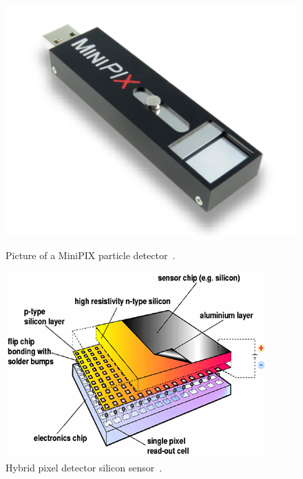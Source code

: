 \begin{figure}[h!]
  \begin{minipage}[c]{0.40\linewidth}
    \includegraphics[width=\linewidth]{Figures/minipix_detector.png}
    \caption{Picture of a MiniPIX particle detector~\cite{advacam}.} %
    \label{fig:minipix}
  \end{minipage}
  \hfill
  \begin{minipage}[c]{0.45\linewidth}
    \includegraphics[width=\linewidth]{Figures/Silicon_sensor.png}
    \caption{Hybrid pixel detector silicon sensor~\cite{silicon_sensor}.} %
    \label{fig:minipixlayers}
  \end{minipage}
\end{figure}

